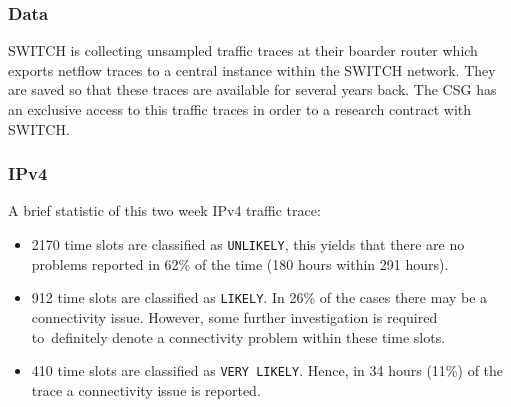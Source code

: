 \subsubsection{Data}
SWITCH is collecting unsampled traffic traces at their boarder router which exports netflow traces to a central instance within the SWITCH network. They are saved so that these traces are available for several years back. The CSG has an exclusive access to this traffic traces in order to a research contract with SWITCH.

\subsubsection{IPv4}
A brief statistic of this two week IPv4 traffic trace:
\begin{itemize}
	\item 2170 time slots are classified as \texttt{UNLIKELY}, this yields that there are no problems reported in 62\% of the time (180 hours within 291 hours).
	\item 912 time slots are classified as \texttt{LIKELY}. In 26\% of the cases there may be a connectivity issue. However, some further investigation is required to definitely denote a connectivity problem within these time slots.
	\item 410 time slots are classified as \texttt{VERY LIKELY}. Hence, in 34 hours (11\%) of the trace a connectivity issue is reported.
\end{itemize}

